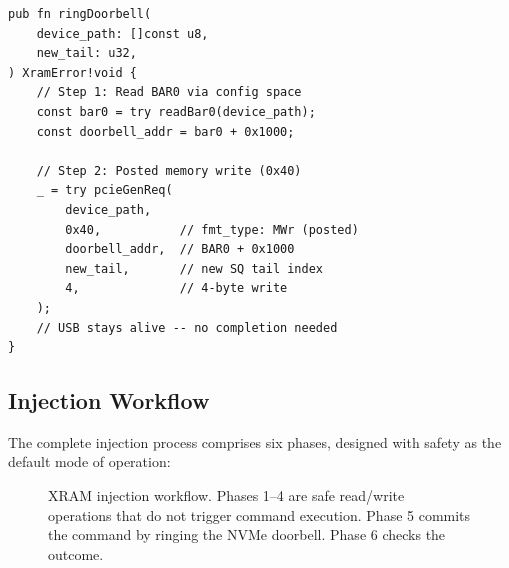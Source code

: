 \documentclass[conference]{IEEEtran}
\begin{document}
\begin{lstlisting}[language=Zig,caption={Doorbell ring via PCIe TLP
engine (simplified from xram.zig).},label={lst:doorbell}]
pub fn ringDoorbell(
    device_path: []const u8,
    new_tail: u32,
) XramError!void {
    // Step 1: Read BAR0 via config space
    const bar0 = try readBar0(device_path);
    const doorbell_addr = bar0 + 0x1000;

    // Step 2: Posted memory write (0x40)
    _ = try pcieGenReq(
        device_path,
        0x40,           // fmt_type: MWr (posted)
        doorbell_addr,  // BAR0 + 0x1000
        new_tail,       // new SQ tail index
        4,              // 4-byte write
    );
    // USB stays alive -- no completion needed
}
\end{lstlisting}


\subsection{Injection Workflow}
\label{sec:workflow}

The complete injection process comprises six phases, designed with safety
as the default mode of operation:

\begin{figure}[ht]
\centering
{}
\caption{XRAM injection workflow. Phases 1--4 are safe read/write
operations that do not trigger command execution. Phase 5 commits the
command by ringing the NVMe doorbell. Phase 6 checks the outcome.}
\label{fig:workflow}
\end{figure}
\end{document}
